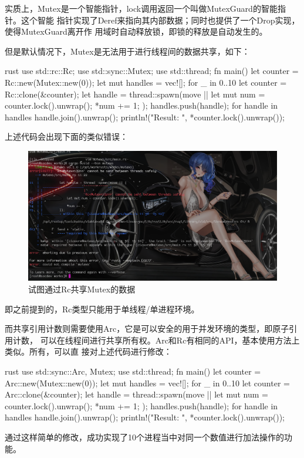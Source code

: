 实质上，Mutex是一个智能指针，lock调用返回一个叫做MutexGuard的智能指针。这个智能
指针实现了Deref来指向其内部数据；同时也提供了一个Drop实现，使得MutexGuard离开作
用域时自动释放锁，即锁的释放是自动发生的。

但是默认情况下，Mutex是无法用于进行线程间的数据共享，如下：
\begin{code-block}{rust}
use std::rc::Rc;
use std::sync::Mutex;
use std::thread;
fn main() {
    let counter = Rc::new(Mutex::new(0));
    let mut handles = vec![];
    for _ in 0..10 {
        let counter = Rc::clone(&counter);
        let handle = thread::spawn(move || {
            let mut num = counter.lock().unwrap();
            *num += 1;
        });
        handles.push(handle);
    }
    for handle in handles {
        handle.join().unwrap();
    }
    println!("Result: {}", *counter.lock().unwrap());
}
\end{code-block}
上述代码会出现下面的类似错误：
\begin{figure}[H]
  \centering
  \includegraphics[width=\linewidth]{rust_mutex_share_error.png}
  \caption{试图通过Rc共享Mutex的数据}
  \label{fig:rust_mutex_share_error}
\end{figure}
即之前提到的，Rc类型只能用于单线程/单进程环境。

而共享引用计数则需要使用Arc，它是可以安全的用于并发环境的类型，即原子引用计数，
可以在线程间进行共享所有权。Arc和Rc有相同的API，基本使用方法上类似。所有，可以直
接对上述代码进行修改：
\begin{code-block}{rust}
use std::sync::{Arc, Mutex};
use std::thread;
fn main() {
    let counter = Arc::new(Mutex::new(0));
    let mut handles = vec![];
    for _ in 0..10 {
        let counter = Arc::clone(&counter);
        let handle = thread::spawn(move || {
            let mut num = counter.lock().unwrap();
            *num += 1;
        });
        handles.push(handle);
    }
    for handle in handles {
        handle.join().unwrap();
    }
    println!("Result: {}", *counter.lock().unwrap());
}
\end{code-block}
通过这样简单的修改，成功实现了10个进程当中对同一个数值进行加法操作的功能。

